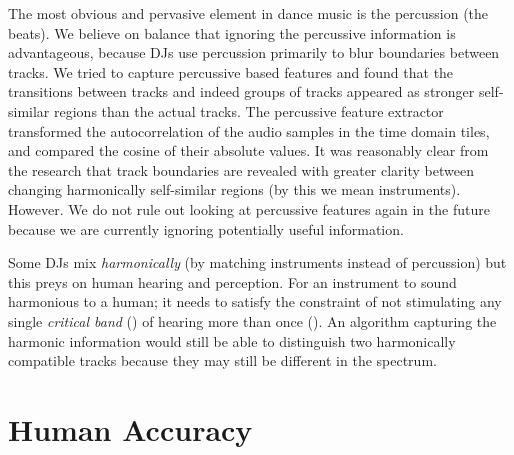 \documentclass[twocolumn]{article}
\begin{document}
	The most obvious and pervasive element in dance music is the percussion (the beats). We believe on balance that ignoring the percussive information is advantageous, because DJs use percussion primarily to blur boundaries between tracks.  We tried to capture percussive based features and found that the transitions between tracks and indeed groups of tracks appeared as stronger self-similar regions than the actual tracks. The percussive feature extractor transformed the autocorrelation of the audio samples in the time domain tiles, and compared the cosine of their absolute values. It was reasonably clear from the research that track boundaries are revealed with greater clarity between changing harmonically self-similar regions (by this we mean instruments). However. We do not rule out looking at percussive features again in the future because we are currently ignoring potentially useful information.
	
	Some DJs mix \textit{harmonically} (by matching instruments instead of percussion) but this preys on human hearing and perception. For an instrument to sound harmonious to a human; it needs to satisfy the constraint of not stimulating any single \textit{critical band} (\citep{boer1974critical}) of hearing more than once (\citep{plomp1965tonal}). An algorithm capturing the harmonic information would still be able to distinguish two harmonically compatible tracks because they may still be different in the spectrum. 
	
	\section{Human Accuracy}\label{human_acc}
	
\end{document}
